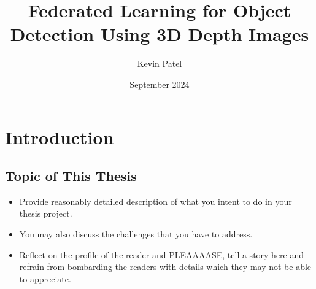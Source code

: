 \documentclass[thesis]{mas_proposal}
\title{Federated Learning for Object Detection Using 3D Depth Images}
\author{Kevin Patel}
\date{September 2024}
\begin{document}
\maketitle

\pagestyle{plain}

\section{Introduction}

\subsection{Topic of This Thesis}
\begin{itemize}
      \item Provide reasonably detailed description of what you intent to do in your thesis project.
      \item You may also discuss the challenges that you have to address.
      \item Reflect on the profile of the reader and PLEAAAASE, tell a story here and refrain from bombarding the readers with details which they may not be able to appreciate.


\end{itemize}
\end{document}
